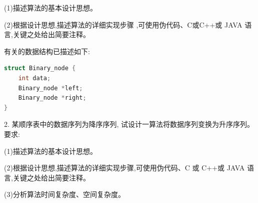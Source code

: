 (1)描述算法的基本设计思想。

(2)根据设计思想,描述算法的详细实现步骤 ,可使用伪代码、C或C++或 JAVA 语言,关键之处给出简要注释。

有关的数据结构已描述如下:

\begin{lstlisting}[language=C, basicstyle=\ttfamily]
struct Binary_node {
    int data;
    Binary_node *left;
    Binary_node *right;
}
\end{lstlisting}
\vspace{10em}

2. 某顺序表中的数据序列为降序序列, 试设计一算法将数据序列变换为升序序列。要求:

(1)描述算法的基本设计思想。

(2)根据设计思想,描述算法的详细实现步骤,可使用伪代码、C 或 C++或 JAVA 语言,关键之处给出简要注释。

(3)分析算法时间复杂度、空间复杂度。